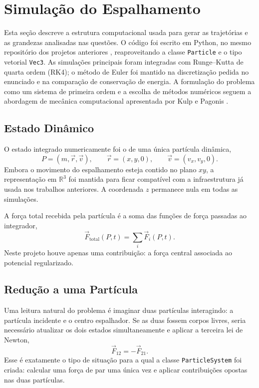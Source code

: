 \section{Simula\c{c}\~ao do Espalhamento}
\label{sec:simulacao}

Esta se\c{c}\~ao descreve a estrutura computacional usada para gerar as trajet\'orias e as grandezas analisadas nas quest\~oes. O c\'odigo foi escrito em Python, no mesmo reposit\'orio dos projetos anteriores \cite{mecanica-geral-repo-2026}, reaproveitando a classe \texttt{Particle} e o tipo vetorial \texttt{Vec3}. As simula\c{c}\~oes principais foram integradas com Runge--Kutta de quarta ordem (RK4); o m\'etodo de Euler foi mantido na discretiza\c{c}\~ao pedida no enunciado e na compara\c{c}\~ao de conserva\c{c}\~ao de energia. A formula\c{c}\~ao do problema como um sistema de primeira ordem e a escolha de m\'etodos num\'ericos seguem a abordagem de mec\^anica computacional apresentada por Kulp e Pagonis \cite{kulp-pagonis-cm-2020}.

\subsection{Estado Din\^amico}

O estado integrado numericamente foi o de uma \'unica part\'icula din\^amica,
\begin{equation}
    P = (m,\vec r,\vec v),
    \qquad
    \vec r = (x,y,0),
    \qquad
    \vec v = (v_x,v_y,0).
\end{equation}
Embora o movimento do espalhamento esteja contido no plano $xy$, a representa\c{c}\~ao em \(\mathbb{R}^3\) foi mantida para ficar compat\'ivel com a infraestrutura j\'a usada nos trabalhos anteriores. A coordenada $z$ permanece nula em todas as simula\c{c}\~oes.

A for\c{c}a total recebida pela part\'icula \'e a soma das fun\c{c}\~oes de for\c{c}a passadas ao integrador,
\begin{equation}
    \vec F_{\text{total}}(P,t) = \sum_i \vec F_i(P,t).
\end{equation}
Neste projeto houve apenas uma contribui\c{c}\~ao: a for\c{c}a central associada ao potencial regularizado.

\subsection{Redu\c{c}\~ao a uma Part\'icula}

Uma leitura natural do problema \'e imaginar duas part\'iculas interagindo: a part\'icula incidente e o centro espalhador. Se as duas fossem corpos livres, seria necess\'ario atualizar os dois estados simultaneamente e aplicar a terceira lei de Newton,
\begin{equation}
    \vec F_{12} = -\vec F_{21}.
\end{equation}
Esse \'e exatamente o tipo de situa\c{c}\~ao para a qual a classe \texttt{ParticleSystem} foi criada: calcular uma for\c{c}a de par uma \'unica vez e aplicar contribui\c{c}\~oes opostas nas duas part\'iculas.

